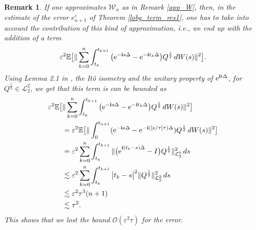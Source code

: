 \documentclass[a4paper]{amsart}
\newtheorem{remark}{Remark}[section]
\begin{document}
\begin{remark}
    If one approximates $\mathcal{W}_n$ as in Remark \ref{app_W}, then, in the estimate of the error $e^\varepsilon_{n+1}$  of Theorem \ref{lobg_term_res1}, one has to take into account the contribution of this kind of approximation, i.e., we end up with the addition of a term
    $$
    \varepsilon^2 \mathbb{E}\big[\|\sum_{k=0}^{n}\int_{t_k}^{t_{k+1}} \big({\rm e}^{-{\bf i}s\Delta} -{\rm e}^{-{\bf i}t_k \Delta} \big)Q^{\frac{1}{2}}\,dW(s)\|^2\big].
    $$
    Using Lemma 2.1 in \cite{an_co}, the Itô isometry and the unitary property of ${\rm e}^{{\bf i}t\Delta}$, for $Q^{\frac{1}{2}}\in\mathcal{L}_2^2$, we get that this term is can be bounded as 
    \begin{align*}
    &\varepsilon^2 \mathbb{E}\big[\|\sum_{k=0}^{n}\int_{t_k}^{t_{k+1}} \big({\rm e}^{-{\bf i}s\Delta} -{\rm e}^{-{\bf i}t_k \Delta} \big)Q^{\frac{1}{2}}\,dW(s)\|^2\big]\\
    &\qquad = \varepsilon^2 
    \mathbb{E}\big[\|\int_0^{t_{n+1}} ({\rm e}^{-{\bf i}s\Delta}-{\rm e}^{-{\bf i}([s/\tau]\tau)\Delta})Q^{\frac{1}{2}}\,dW(s)\|^2\big]\\
    &\qquad = \varepsilon^2 \sum_{k=0}^{n}\int_{t_k}^{t_{k+1}}\|{\big(\rm e}^{{\bf i}(t_k-s)\Delta}-I\big)Q^{\frac{1}{2}}\|^2_{\mathcal{L}_2^0}\,ds\\
    &\qquad \lesssim \varepsilon^2 \sum_{k=0}^{n}\int_{t_k}^{t_{k+1}}\big|t_k-s\big|^2 \|Q^{\frac{1}{2}}\|^2_{\mathcal{L}_2^2}\,ds\\
    &\qquad \lesssim \varepsilon^2 \tau^3 (n+1)\\
    &\qquad \lesssim \tau^2.
    \end{align*}
    This shows that we lost the bound $\mathcal{O}(\varepsilon^2 \tau)$ for the error.
\end{remark}
\end{document}

